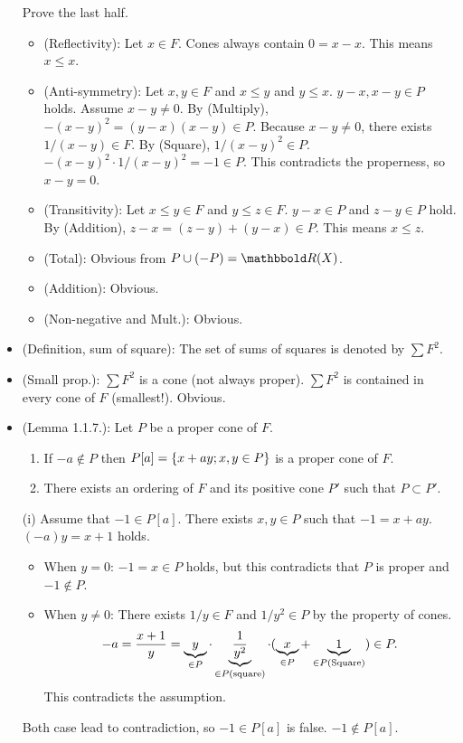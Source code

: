 \documentclass[9pt]{ltjsarticle}
\begin{document}
\begin{itemize}
  Prove the last half.
  \begin{itemize}
    \item (Reflectivity): Let $x\in F$. Cones always contain $0 = x-x$.  This means $x\le x$.
    \item (Anti-symmetry):
    Let $x,y \in F$ and $x\le y$ and $y\le x$.
    $y-x,x-y\in P$ holds.  Assume $x-y\neq 0$.
    By (Multiply), $-(x-y)^2 = (y-x)(x-y) \in P$.
    Because $x-y \neq 0$, there exists $1/(x-y)\in F$.
    By (Square), $1/(x-y)^2 \in P$.
    $-(x-y)^2 \cdot 1/(x-y)^2 = -1 \in P$.
    This contradicts the properness, so $x-y=0$.
    \item (Transitivity):
    Let $x\le y \in F$ and $y\le z \in F$.
    $y-x \in P$ and $z-y\in P$ hold.
    By (Addition), $z-x = (z-y) + (y-x) \in P$.
    This means $x\le z$.
    \item
    (Total):
    Obvious from $P\cup (-P)= \R (X)$.
    \item
    (Addition):
    Obvious.
    \item
    (Non-negative and Mult.):
    Obvious.
  \end{itemize}
  \item
  (Definition, sum of square):
  The set of sums of squares is denoted by $\sum F^2$.
  \item
  (Small prop.):
  $\sum F^2$ is a cone (not always proper).
  $\sum F^2$ is contained in every cone of $F$ (smallest!).
  \pf Obvious.
  \item
  (Lemma 1.1.7.):
  Let $P$ be a proper cone of $F$.
  \begin{enumerate}[label=(\roman*)]
    \item If $-a \notin P$ then $P[a]=\left\{x+ay; x,y\in P\right\}$ is a proper cone of $F$.
    \item There exists an ordering of $F$ and its positive cone $P'$ such that $P \subset P'$.
  \end{enumerate}

  \pf (i)
  Assume that $-1 \in P[a]$. There exists $x,y \in P$ such that
  $-1  = x + ay$.  $(-a)y = x+1$ holds.
  \begin{itemize}
    \item When $y=0$:
    $-1 = x \in P$ holds, but this contradicts that $P$ is proper and $-1 \notin P$.
    \item When $y\neq 0$:
    There exists $1/y \in F$ and $1/y^2 \in P$ by the property of cones.
    \begin{align}
      -a = \frac{x+1}{y} = \underbrace{y}_{\in P}\cdot \underbrace{\frac{1}{y^2}}_{\in P \text{(square)}} \cdot (\underbrace{x}_{\in P}+\underbrace{1}_{\in P \text{(Square)}}) \in P.
    \end{align}
    This contradicts the assumption.
  \end{itemize}
  Both case lead to contradiction, so $-1 \in P[a]$ is false.
  $-1 \notin P[a]$.


\end{itemize}
\end{document}
